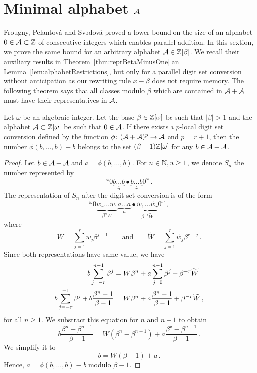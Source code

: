 \section{Minimal alphabet $\mathcal{A}$}
\label{sec:minimalAlphabet}	

Frougny, Pelantov\'a and Svodov\'a \cite{minAlph} proved a lower bound on the size of an alphabet $0\in\mathcal{A}\subset\mathbb{Z}$ of consecutive integers which enables parallel addition. In this sextion, we prove the same bound for an arbitrary alphabet $\mathcal{A}\in\mathbb{Z}[\beta]$. We recall their auxiliary results in Theorem~\ref{thm:reprBetaMinusOne} an Lemma~\ref{lem:alphabetRestrictions}, but only for a parallel digit set conversion without anticipation as our rewriting rule $x-\beta$ does not require memory. The following theorem says that all classes modulo $\beta$ which are contained in $\mathcal{A}+\mathcal{A}$ must have their representatives in $\mathcal{A}$.
\begin{thm}
\label{thm:reprBetaMinusOne}
Let $\omega$ be an algebraic integer. Let the base $\beta\in\mathbb{Z}[\omega]$ be such that $|\beta|>1$ and the alphabet $\mathcal{A}\subset\mathbb{Z}[\omega]$ be such that $0\in\mathcal{A}$. If there exists a $p$-local digit set conversion defined by the function $\phi\colon (\mathcal{A}+\mathcal{A})^p\rightarrow \mathcal{A}$ and $p=r+1$, then the number $\phi(b,\dots,b)-b$ belongs to the set $(\beta-1)\mathbb{Z}[\omega]$ for any $b\in\mathcal{A}+\mathcal{A}$. 
\end{thm}
\begin{proof}
Let $b\in\mathcal{A}+\mathcal{A}$ and $a=\phi(b, \dots,b)$. For $n\in\mathbb{N}, n\geq 1$, we denote $S_n$ the number represented by
$$
^{\omega}\!0 \underbrace{b\dots b}_{n}\bullet \underbrace{b\dots b}_{r}0^\omega\,.
$$
The representation of $S_n$ after the digit set conversion is of the form
$$
^{\omega}\!0 \underbrace{w_{r}\dots w_{1}}_{\beta^n W}\underbrace{a\dots a}_{n}\bullet \underbrace{\widetilde{w_1}\dots \widetilde{w_r}}_{\beta^{-r}\widetilde{W}}0^\omega\,,
$$
where 
$$W=\sum_{j=1}^r w_j \beta^{j-1} \qquad \text{and} \qquad \widetilde{W}=\sum_{j=1}^r\widetilde{w_j} \beta^{r-j}\,.$$
Since both representations have same value, we have
\begin{align}
\label{eq:reprBetaMinusOne}
b \sum_{j=-r}^{n-1} \beta^j &= W \beta^n + a \sum_{j=0}^{n-1} \beta^j + \beta^{-r}\widetilde{W} \notag \\
b \sum_{j=-r}^{-1} \beta^j +b\frac{\beta^n-1}{\beta-1} &= W \beta^n + a \frac{\beta^n-1}{\beta-1} + \beta^{-r}\widetilde{W}\,,
\end{align}
for all $n\geq 1$. We substract this equation for $n$ and $n-1$ to obtain
$$
b\frac{\beta^n-\beta^{n-1}}{\beta-1}=W(\beta^n-\beta^{n-1}) + a\frac{\beta^n-\beta^{n-1}}{\beta-1}\,.
$$
We simplify it to
\begin{equation}
\label{eq:reprBetaMinusOneFinal}
b=W(\beta-1) + a\,.
\end{equation}
Hence, $a=\phi(b, \dots,b)\equiv b$ modulo $\beta-1$.
\end{proof}

